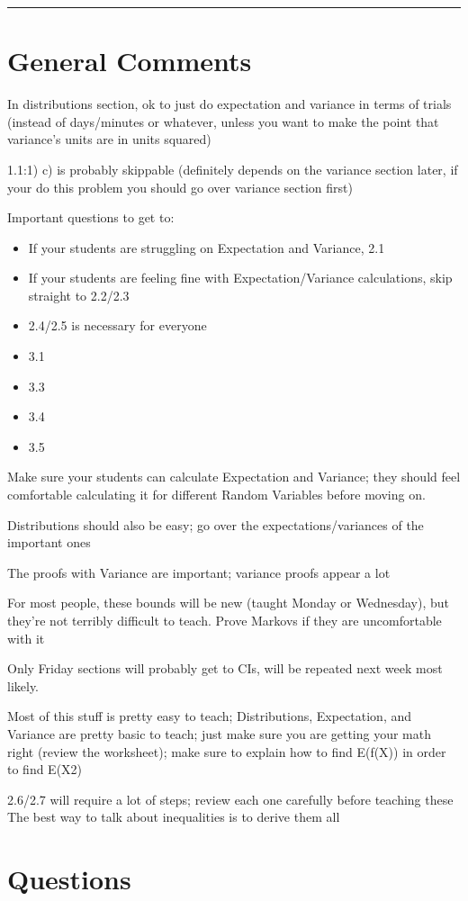 \documentclass{exam}
\title{}
\date{Distributions, Variance, Inequalities, Confidence Intervals}
\begin{document}
\maketitle
\rule{\textwidth}{0.15em}
\fontsize{12}{15}\selectfont
\thispagestyle{empty}


\section{General Comments}
\begin{questions}
\item In distributions section, ok to just do expectation and variance in terms of trials (instead of days/minutes or whatever, unless you want to make the point that variance’s units are in units squared)
\item 1.1:1) c) is probably skippable (definitely depends on the variance section later, if your do this problem you should go over variance section first)
\item Important questions to get to:
\begin{itemize}
\item If your students are struggling on Expectation and Variance, 2.1
\item If your students are feeling fine with Expectation/Variance calculations, skip straight to 2.2/2.3
\item 2.4/2.5 is necessary for everyone
\item 3.1
\item 3.3
\item 3.4
\item 3.5
\end{itemize}

\item Make sure your students can calculate Expectation and Variance; they should feel comfortable calculating it for different Random Variables before moving on.
\item Distributions should also be easy; go over the expectations/variances of the important ones
\item The proofs with Variance are important; variance proofs appear a lot
\item For most people, these bounds will be new (taught Monday or Wednesday), but they’re not terribly difficult to teach. Prove Markovs if they are uncomfortable with it
\item Only Friday sections will probably get to CIs, will be repeated next week most likely. 

\item Most of this stuff is pretty easy to teach; Distributions, Expectation, and Variance are pretty basic to teach; just make sure you are getting your math right (review the worksheet); make sure to explain how to find E(f(X)) in order to find E(X2)
\item 2.6/2.7 will require a lot of steps; review each one carefully before teaching these
The best way to talk about inequalities is to derive them all
\end{questions}

\section{Questions}
 
\end{document}
